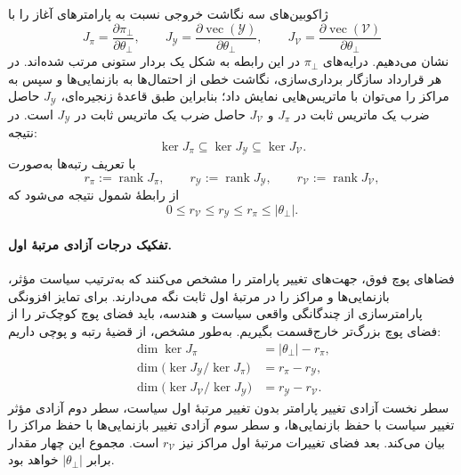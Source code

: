 ژاکوبین‌های سه نگاشت خروجی نسبت به پارامترهای آغاز را با
\begin{equation}\label{cmp:eq:ch3-geometry-parametric-start-jacobians}
J_\pi=\frac{\partial\pi_\bot}{\partial\theta_\bot},\qquad
J_{\mathscr Y}=\frac{\partial\operatorname{vec}(\mathscr Y)}{\partial\theta_\bot},\qquad
J_{\mathcal V}=\frac{\partial\operatorname{vec}(\mathcal V)}{\partial\theta_\bot}
\end{equation}
نشان می‌دهیم. درایه‌های $\pi_\bot$ در این رابطه به شکل یک بردار ستونی مرتب شده‌اند. در هر قرارداد سازگار برداری‌سازی، نگاشت خطی از احتمال‌ها به بازنمایی‌ها و سپس به مراکز را می‌توان با ماتریس‌هایی نمایش داد؛ بنابراین طبق قاعدهٔ زنجیره‌ای، $J_{\mathscr Y}$ حاصل ضرب یک ماتریس ثابت در $J_\pi$ و $J_{\mathcal V}$ حاصل ضرب یک ماتریس ثابت در $J_{\mathscr Y}$ است. در نتیجه:
\begin{equation}\label{cmp:eq:ch3-geometry-parametric-kernel-inclusion}
\boxed{\ker J_\pi\subseteq\ker J_{\mathscr Y}\subseteq\ker J_{\mathcal V}.}
\end{equation}
با تعریف رتبه‌ها به‌صورت
\begin{equation}\label{cmp:eq:ch3-geometry-parametric-ranks}
r_\pi:=\operatorname{rank}J_\pi,\qquad
r_{\mathscr Y}:=\operatorname{rank}J_{\mathscr Y},\qquad
r_{\mathcal V}:=\operatorname{rank}J_{\mathcal V},
\end{equation}
از رابطهٔ شمول نتیجه می‌شود که
\begin{equation}\label{cmp:eq:ch3-geometry-parametric-rank-inclusion}
0\le r_{\mathcal V}\le r_{\mathscr Y}\le r_\pi\le|\theta_\bot|.
\end{equation}

\paragraph{تفکیک درجات آزادی مرتبهٔ اول.}
فضاهای پوچ فوق، جهت‌های تغییر پارامتر را مشخص می‌کنند که به‌ترتیب سیاست مؤثر، بازنمایی‌ها و مراکز را در مرتبهٔ اول ثابت نگه می‌دارند. برای تمایز افزونگی پارامترسازی از چندگانگی واقعی سیاست و هندسه، باید فضای پوچ کوچک‌تر را از فضای پوچ بزرگ‌تر خارج‌قسمت بگیریم. به‌طور مشخص، از قضیهٔ رتبه و پوچی داریم:
\begin{equation}\label{cmp:eq:ch3-geometry-parametric-freedom-decomposition}
\boxed{\begin{aligned}
\dim\ker J_\pi&=|\theta_\bot|-r_\pi,\\
\dim\bigl(\ker J_{\mathscr Y}/\ker J_\pi\bigr)&=r_\pi-r_{\mathscr Y},\\
\dim\bigl(\ker J_{\mathcal V}/\ker J_{\mathscr Y}\bigr)&=r_{\mathscr Y}-r_{\mathcal V}.
\end{aligned}}
\end{equation}
سطر نخست آزادی تغییر پارامتر بدون تغییر مرتبهٔ اول سیاست، سطر دوم آزادی مؤثر تغییر سیاست با حفظ بازنمایی‌ها، و سطر سوم آزادی تغییر بازنمایی‌ها با حفظ مراکز را بیان می‌کند. بعد فضای تغییرات مرتبهٔ اول مراکز نیز $r_{\mathcal V}$ است. مجموع این چهار مقدار برابر $|\theta_\bot|$ خواهد بود.

